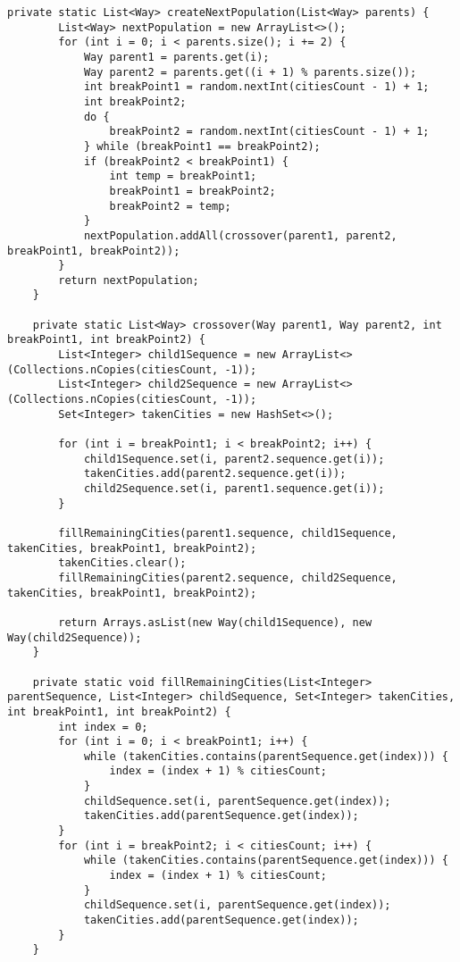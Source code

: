 \documentclass{article}
\begin{document}
\begin{lstlisting}[caption={GeneticAlgorithm}, breaklines=true, linewidth=\textwidth]
    private static List<Way> createNextPopulation(List<Way> parents) {
        List<Way> nextPopulation = new ArrayList<>();
        for (int i = 0; i < parents.size(); i += 2) {
            Way parent1 = parents.get(i);
            Way parent2 = parents.get((i + 1) % parents.size());
            int breakPoint1 = random.nextInt(citiesCount - 1) + 1;
            int breakPoint2;
            do {
                breakPoint2 = random.nextInt(citiesCount - 1) + 1;
            } while (breakPoint1 == breakPoint2);
            if (breakPoint2 < breakPoint1) {
                int temp = breakPoint1;
                breakPoint1 = breakPoint2;
                breakPoint2 = temp;
            }
            nextPopulation.addAll(crossover(parent1, parent2, breakPoint1, breakPoint2));
        }
        return nextPopulation;
    }

    private static List<Way> crossover(Way parent1, Way parent2, int breakPoint1, int breakPoint2) {
        List<Integer> child1Sequence = new ArrayList<>(Collections.nCopies(citiesCount, -1));
        List<Integer> child2Sequence = new ArrayList<>(Collections.nCopies(citiesCount, -1));
        Set<Integer> takenCities = new HashSet<>();

        for (int i = breakPoint1; i < breakPoint2; i++) {
            child1Sequence.set(i, parent2.sequence.get(i));
            takenCities.add(parent2.sequence.get(i));
            child2Sequence.set(i, parent1.sequence.get(i));
        }

        fillRemainingCities(parent1.sequence, child1Sequence, takenCities, breakPoint1, breakPoint2);
        takenCities.clear();
        fillRemainingCities(parent2.sequence, child2Sequence, takenCities, breakPoint1, breakPoint2);

        return Arrays.asList(new Way(child1Sequence), new Way(child2Sequence));
    }

    private static void fillRemainingCities(List<Integer> parentSequence, List<Integer> childSequence, Set<Integer> takenCities, int breakPoint1, int breakPoint2) {
        int index = 0;
        for (int i = 0; i < breakPoint1; i++) {
            while (takenCities.contains(parentSequence.get(index))) {
                index = (index + 1) % citiesCount;
            }
            childSequence.set(i, parentSequence.get(index));
            takenCities.add(parentSequence.get(index));
        }
        for (int i = breakPoint2; i < citiesCount; i++) {
            while (takenCities.contains(parentSequence.get(index))) {
                index = (index + 1) % citiesCount;
            }
            childSequence.set(i, parentSequence.get(index));
            takenCities.add(parentSequence.get(index));
        }
    }


\end{lstlisting}
\end{document}
